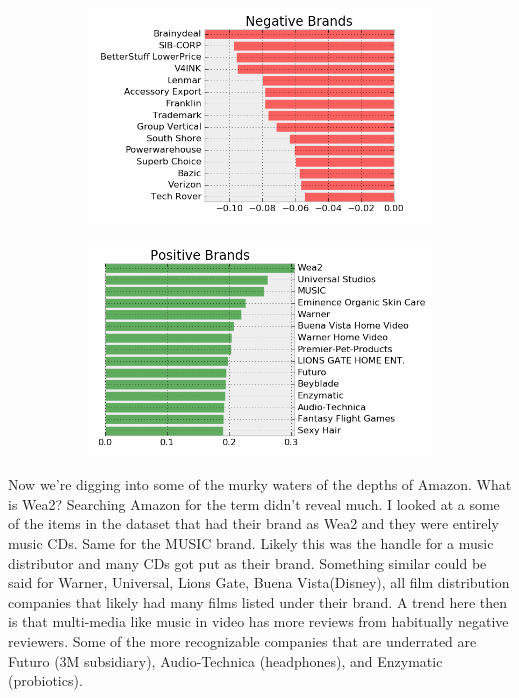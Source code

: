 \documentclass[a4paper,10pt]{article}
\begin{document}
\begin{figure}[H]
\centering
\begin{subfigure}{.5\textwidth}
  \centering
  \includegraphics[width=1\linewidth]{change_by_brand_neg.png}
  \label{fig:sub1}
\end{subfigure}%
\begin{subfigure}{.5\textwidth}
  \centering
  \includegraphics[width=1\linewidth]{change_by_brand_pos.png}
  \label{fig:sub2}
\end{subfigure}
\label{fig:test}
\end{figure}

Now we're digging into some of the murky waters of the depths of Amazon. What is Wea2? Searching Amazon for the term didn't reveal much. I looked at a some of the items in the dataset that had their brand as Wea2 and they were entirely music CDs. Same for the MUSIC brand. Likely this was the handle for a music distributor and many CDs got put as their brand. Something similar could be said for Warner, Universal, Lions Gate, Buena Vista(Disney), all film distribution companies that likely had many films listed under their brand. A trend here then is that multi-media like music in video has more reviews from habitually negative reviewers. Some of the more recognizable companies that are underrated are Futuro (3M subsidiary), Audio-Technica (headphones), and Enzymatic (probiotics). 
\end{document}
